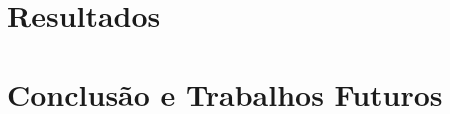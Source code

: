 \documentclass[
	12pt,				%
	openright,			%
	oneside,			%
	a4paper,			%
	chapter=TITLE,		%
	english,			%
	french,				%
	spanish,			%
	brazil				%
	]{abntex2}
\newif\ifisTipoDocumento
\begin{document}
\ifisTipoDocumento
\chapter[Alocação de Recursos]{Alocação de Recursos}

\else
\chapter[Resultados]{Resultados}

\fi


\ifisTipoDocumento
\else
\chapter[Conclusão e Trabalhos Futuros]{Conclusão e Trabalhos Futuros}

\fi


\postextual







%
% 
% 
% 

\printindex
\end{document}
